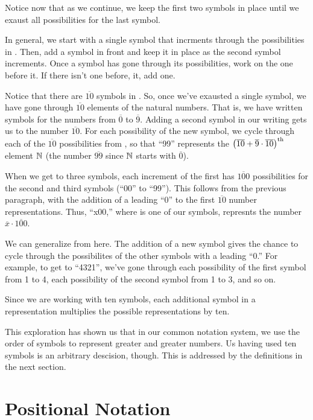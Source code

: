 \documentclass{article}
\begin{document}
	Notice now that as we continue, we keep the first two symbols in place until we exaust all possibilities for the last symbol.
	
	In general, we start with a single symbol that incrments through the possibilities in . Then, add a symbol in front and keep it in place as the second symbol increments. Once a symbol has gone through its possibilities, work on the one before it. If there isn't one before, it, add one.
	
	Notice that there are $\overline{10}$ symbols in . So, once we've exausted a single symbol, we have gone through $\overline{10}$ elements of the natural numbers. That is, we have written symbols for the numbers from $\overline{0}$ to $\overline{9}$. Adding a second symbol in our writing gets us to the number $\overline{10}$. For each possibility of the new symbol, we cycle through each of the $\overline{10}$ possibilities from , so that ``99'' represents the $\pqty{\overline{10}+\overline{9}\cdot\overline{10}}^\text{th}$ element $\mathbb{N}$ (the number $\overline{99}$ since $\mathbb{N}$ starts with $\overline{0}$).
	
	When we get to three symbols, each increment of the first has $\overline{100}$ possibilities for the second and third symbols (``00'' to ``99''). This follows from the previous paragraph, with the addition of a leading ``0'' to the first $\overline{10}$ number representations. Thus, ``x00,'' where is one of our symbols, represnts the number $\overline{x}\cdot\overline{100}$.
	
	
	We can generalize from here. The addition of a new symbol gives the chance to cycle through the possibilites of the other symbols with a leading ``0.'' For example, to get to ``4321'', we've gone through each possibility of the first symbol from 1 to 4, each possibility of the second symbol from 1 to 3, and so on. 
	
	Since we are working with ten symbols, each additional symbol in a representation multiplies the possible representations by ten.
	
	This exploration has shown us that in our common notation system, we use the order of symbols to represent greater and greater numbers. Us having used ten symbols is an arbitrary descision, though. This is addressed by the definitions in the next section.
	
	\section{Positional Notation}
\end{document}
